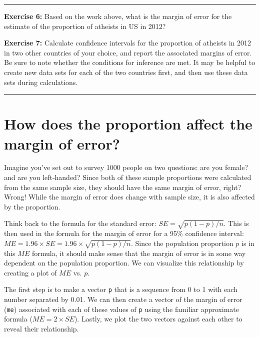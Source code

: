 \documentclass[]{book}
\theoremstyle{definition}
\theoremstyle{definition}
\theoremstyle{definition}
\theoremstyle{remark}
\begin{document}
\begin{center}\rule{0.5\linewidth}{\linethickness}\end{center}

\textbf{Exercise 6:} Based on the work above, what is the margin of
error for the estimate of the proportion of atheists in US in 2012?

\textbf{Exercise 7:} Calculate confidence intervals for the proportion
of atheists in 2012 in two other countries of your choice, and report
the associated margins of error. Be sure to note whether the conditions
for inference are met. It may be helpful to create new data sets for
each of the two countries first, and then use these data sets during
calculations.

\begin{center}\rule{0.5\linewidth}{\linethickness}\end{center}

\section{How does the proportion affect the margin of
error?}\label{how-does-the-proportion-affect-the-margin-of-error}

Imagine you've set out to survey 1000 people on two questions: are you
female? and are you left-handed? Since both of these sample proportions
were calculated from the same sample size, they should have the same
margin of error, right? Wrong! While the margin of error does change
with sample size, it is also affected by the proportion.

Think back to the formula for the standard error:
\(SE = \sqrt{p(1-p)/n}\). This is then used in the formula for the
margin of error for a 95\% confidence interval:
\(ME = 1.96\times SE = 1.96\times\sqrt{p(1-p)/n}\). Since the population
proportion \(p\) is in this \(ME\) formula, it should make sense that
the margin of error is in some way dependent on the population
proportion. We can visualize this relationship by creating a plot of
\(ME\) vs. \(p\).

The first step is to make a vector \texttt{p} that is a sequence from 0
to 1 with each number separated by 0.01. We can then create a vector of
the margin of error (\texttt{me}) associated with each of these values
of \texttt{p} using the familiar approximate formula
(\(ME = 2 \times SE\)). Lastly, we plot the two vectors against each
other to reveal their relationship.
\end{document}
